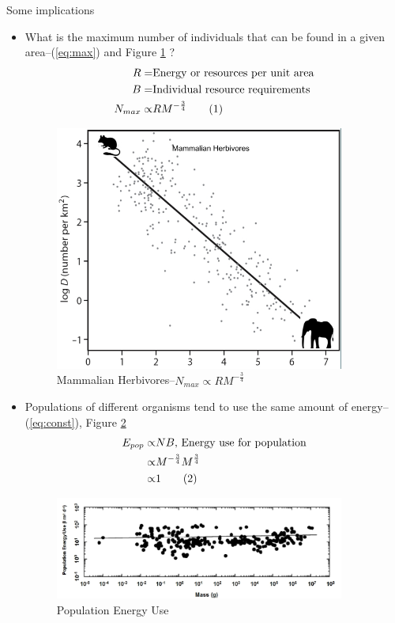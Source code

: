 \documentclass[]{article}
\newcommand\numberthis{\addtocounter{equation}{1}\tag{\theequation}}
\begin{document}
Some implications 

\begin{itemize}
	\item What is the maximum number of individuals that can be found in a given area--(\ref{eq:max}) and Figure \ref{fig:MammalianHerbivores} \cite{damuth1981population}?
	\begin{align*}
	R=& \text{Energy or resources per unit area}\\
	B=&\text{Individual resource requirements}\\
	N_{max}\propto& R M^{-\frac{3}{4}}\label{eq:max}\numberthis
	\end{align*}
	\begin{figure}[H]
		\caption{Mammalian Herbivores--$N_{max}\propto R M^{-\frac{3}{4}}$}\label{fig:MammalianHerbivores}
		\includegraphics[width=0.9\textwidth]{MammalianHerbivores}
	\end{figure}	
	\item Populations of different organisms tend to use the same amount of energy--(\ref{eq:const}), Figure \ref{fig:PopulationEnergyUse} \cite{enquist1998allometric} 
	\begin{align*}
	E_{pop}\propto&N B\text{, Energy use for population}\\
	\propto& M^{-\frac{3}{4}} M^{\frac{3}{4}}\\
	\propto& 1\label{eq:const}\numberthis
	\end{align*}
	\begin{figure}[H]
		\caption{Population Energy Use}\label{fig:PopulationEnergyUse}
		\includegraphics[width=0.9\textwidth]{PopulationEnergyUse}

\end{figure}
\end{itemize}
\end{document}

